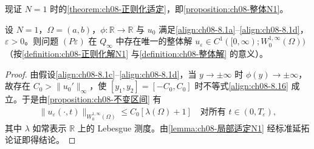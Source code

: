 \documentclass[../../main.tex]{subfiles}%
\begin{document}
现证 $N=1$ 时的\cref{theorem:ch08-正则化适定}，即\cref{proposition:ch08-整体N1}。

\begin{proposition}[$N=1$ 的整体解]\label{proposition:ch08-整体N1}
设 $N=1$，$\Omega=(a,b)$，$\phi:\mathbb{R}\to\mathbb{R}$ 与 $u_0$ 满足\eqref{align:ch08-8.1a}--\eqref{align:ch08-8.1d}，$\varepsilon>0$。则问题 $(P\varepsilon)$ 在 $Q_\infty$ 中存在唯一的整体解 $u_\varepsilon\in C^1([0,\infty);W^{1,\infty}_0(\Omega))$（按\cref{definition:ch08-正则化解N1} 与\cref{definition:ch08-整体解} 的意义）。
\end{proposition}

\begin{proof}
由假设\eqref{align:ch08-8.1c}--\eqref{align:ch08-8.1d}，当 $y\to\pm\infty$ 时 $\phi(y)\to\pm\infty$，故存在 $C_0>\|u_0'\|_\infty$，使 $[y_1,y_2]=[-C_0,C_0]$ 时不等式\eqref{align:ch08-8.16} 成立。于是由\cref{proposition:ch08-不变区间} 有
\begin{align}
\|u_\varepsilon(\cdot,t)\|_{W^{1,\infty}_0(\Omega)}\leqslant C_0[\lambda(\Omega)+1]\quad\text{对所有 }t\in(0,T_\varepsilon), \label{align:ch08-8.17}
\end{align}
其中 $\lambda$ 如常表示 $\mathbb{R}$ 上的 Lebesgue 测度。由\cref{lemma:ch08-局部适定N1} 经标准延拓论证即得结论。
\end{proof}
\end{document}
